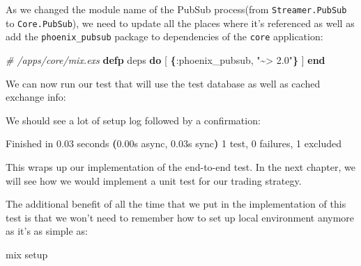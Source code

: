 \documentclass[
  oneside]{book}
\newenvironment{Shaded}{\begin{snugshade}}{\end{snugshade}}
\newcommand{\CommentTok}[1]{\textcolor[rgb]{0.56,0.35,0.01}{\textit{#1}}}
\newcommand{\ErrorTok}[1]{\textcolor[rgb]{0.64,0.00,0.00}{\textbf{#1}}}
\newcommand{\ExtensionTok}[1]{#1}
\newcommand{\FunctionTok}[1]{\textcolor[rgb]{0.13,0.29,0.53}{\textbf{#1}}}
\newcommand{\KeywordTok}[1]{\textcolor[rgb]{0.13,0.29,0.53}{\textbf{#1}}}
\newcommand{\NormalTok}[1]{#1}
\newcommand{\OtherTok}[1]{\textcolor[rgb]{0.56,0.35,0.01}{#1}}
\newcommand{\StringTok}[1]{\textcolor[rgb]{0.31,0.60,0.02}{#1}}
\newcommand{\VariableTok}[1]{\textcolor[rgb]{0.00,0.00,0.00}{#1}}
\begin{document}
As we changed the module name of the PubSub process(from \texttt{Streamer.PubSub} to \texttt{Core.PubSub}), we need to update all the places where it's referenced as well as add the \texttt{phoenix\_pubsub} package to dependencies of the \texttt{core} application:

\begin{Shaded}
\begin{Highlighting}[]
  \CommentTok{\# /apps/core/mix.exs}
  \KeywordTok{defp}\NormalTok{ deps }\KeywordTok{do}
    \OtherTok{[}
      \FunctionTok{\{}\VariableTok{:phoenix\_pubsub}\NormalTok{, }\StringTok{"\textasciitilde{}\textgreater{} 2.0"}\FunctionTok{\}}
    \OtherTok{]}
  \KeywordTok{end}
\end{Highlighting}
\end{Shaded}

We can now run our test that will use the test database as well as cached exchange info:

\begin{Shaded}
\end{Shaded}

We should see a lot of setup log followed by a confirmation:

\begin{Shaded}
\begin{Highlighting}[]
\ExtensionTok{Finished}\NormalTok{ in 0.03 seconds }\ErrorTok{(}\ExtensionTok{0.00s}\NormalTok{ async, 0.03s sync}\KeywordTok{)}
\ExtensionTok{1}\NormalTok{ test, 0 failures, 1 excluded}
\end{Highlighting}
\end{Shaded}

This wraps up our implementation of the end-to-end test. In the next chapter, we will see how we would implement a unit test for our trading strategy.

The additional benefit of all the time that we put in the implementation of this test is that we won't need to remember how to set up local environment anymore as it's as simple as:

\begin{Shaded}
\begin{Highlighting}[]
\ExtensionTok{mix}\NormalTok{ setup}
\end{Highlighting}
\end{Shaded}
\end{document}
